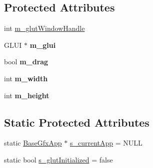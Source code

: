 \subsection*{Protected Attributes}
\begin{DoxyCompactItemize}
\item 
int \hyperlink{classBaseGfxApp_ad8697d6fdd10e6f336c3a662016b4fa7}{m\-\_\-glut\-Window\-Handle}
\item 
\hypertarget{classBaseGfxApp_a6eb1673b80283727221da2242211af1d}{G\-L\-U\-I $\ast$ {\bfseries m\-\_\-glui}}\label{classBaseGfxApp_a6eb1673b80283727221da2242211af1d}

\item 
\hypertarget{classBaseGfxApp_a2e70a389224f8affe7c137f7e20dc8c1}{bool {\bfseries m\-\_\-drag}}\label{classBaseGfxApp_a2e70a389224f8affe7c137f7e20dc8c1}

\item 
\hypertarget{classBaseGfxApp_a7e5ef1c8f25fe081b4a1fd4ce6a96e07}{int {\bfseries m\-\_\-width}}\label{classBaseGfxApp_a7e5ef1c8f25fe081b4a1fd4ce6a96e07}

\item 
\hypertarget{classBaseGfxApp_ac078e4fc20b5c2fe0c744966b850b412}{int {\bfseries m\-\_\-height}}\label{classBaseGfxApp_ac078e4fc20b5c2fe0c744966b850b412}

\end{DoxyCompactItemize}
\subsection*{Static Protected Attributes}
\begin{DoxyCompactItemize}
\item 
static \hyperlink{classBaseGfxApp}{Base\-Gfx\-App} $\ast$ \hyperlink{classBaseGfxApp_a65ba89b98af31e2649a0546631931000}{s\-\_\-current\-App} = N\-U\-L\-L
\item 
static bool \hyperlink{classBaseGfxApp_afa4690383ea27713016ef75b9fb1e42f}{s\-\_\-glut\-Initialized} = false
\end{DoxyCompactItemize}


